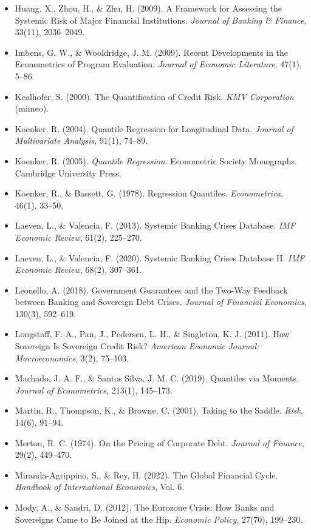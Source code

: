 \documentclass[5p,times,twocolumn,authoryear]{elsarticle}
\begin{document}
\begin{itemize}
    \item Huang, X., Zhou, H., \& Zhu, H. (2009). A Framework for Assessing the Systemic Risk of Major Financial Institutions. \textit{Journal of Banking \& Finance}, 33(11), 2036–2049.
    \item Imbens, G. W., \& Wooldridge, J. M. (2009). Recent Developments in the Econometrics of Program Evaluation. \textit{Journal of Economic Literature}, 47(1), 5–86.
    \item Kealhofer, S. (2000). The Quantification of Credit Risk. \textit{KMV Corporation} (mimeo).
    \item Koenker, R. (2004). Quantile Regression for Longitudinal Data. \textit{Journal of Multivariate Analysis}, 91(1), 74–89.
    \item Koenker, R. (2005). \textit{Quantile Regression}. Econometric Society Monographs. Cambridge University Press.
    \item Koenker, R., \& Bassett, G. (1978). Regression Quantiles. \textit{Econometrica}, 46(1), 33–50.
    \item Laeven, L., \& Valencia, F. (2013). Systemic Banking Crises Database. \textit{IMF Economic Review}, 61(2), 225–270.
    \item Laeven, L., \& Valencia, F. (2020). Systemic Banking Crises Database II. \textit{IMF Economic Review}, 68(2), 307–361.
    \item Leonello, A. (2018). Government Guarantees and the Two-Way Feedback between Banking and Sovereign Debt Crises. \textit{Journal of Financial Economics}, 130(3), 592–619.
    \item Longstaff, F. A., Pan, J., Pedersen, L. H., \& Singleton, K. J. (2011). How Sovereign Is Sovereign Credit Risk? \textit{American Economic Journal: Macroeconomics}, 3(2), 75–103.
    \item Machado, J. A. F., \& Santos Silva, J. M. C. (2019). Quantiles via Moments. \textit{Journal of Econometrics}, 213(1), 145–173.
    \item Martin, R., Thompson, K., \& Browne, C. (2001). Taking to the Saddle. \textit{Risk}, 14(6), 91–94.
    \item Merton, R. C. (1974). On the Pricing of Corporate Debt. \textit{Journal of Finance}, 29(2), 449–470.
    \item Miranda-Agrippino, S., \& Rey, H. (2022). The Global Financial Cycle. \textit{Handbook of International Economics}, Vol. 6.
    \item Mody, A., \& Sandri, D. (2012). The Eurozone Crisis: How Banks and Sovereigns Came to Be Joined at the Hip. \textit{Economic Policy}, 27(70), 199–230.

\end{itemize}
\end{document}
